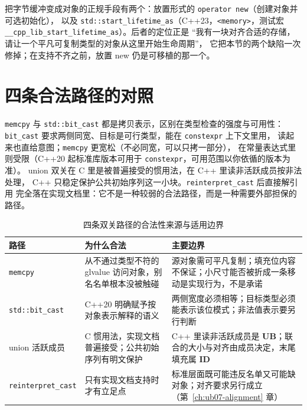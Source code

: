 \documentclass[12pt,a4paper,fontset=fandol]{ctexbook}
\newcommand{\cpp}[1]{C++#1}
\newcommand{\Tp}[1]{\texttt{#1}}
\newcommand{\Bk}{\discretionary{}{}{}}
\newcommand{\Lang}[1]{\textsf{#1}}
\newcommand{\CL}{\Lang{C}}
\newcommand{\CPP}{\Lang{C++}}
\newcommand{\UB}{\textbf{\textsf{UB}}}
\newcommand{\IDB}{\textbf{\textsf{ID}}}
\newcommand{\Hdr}[1]{\texttt{<#1>}}
\newcommand{\Feat}[1]{\texttt{#1}}
\begin{document}
把字节缓冲变成对象的正规手段有两个：放置形式的 \Tp{operator new}（创建对象并可选初始化），
以及 \Tp{std::start{\Bk}\_lifetime{\Bk}\_as}（\cpp{23}，\Hdr{memory}，测试宏
\Feat{\_\_cpp{\Bk}\_lib{\Bk}\_start{\Bk}\_lifetime{\Bk}\_as}）。后者的定位正是
“我有一块对齐合适的存储，请让一个平凡可复制类型的对象从这里开始生命周期”，
它把本节的两个缺陷一次修掉；在支持不齐之前，放置 new 仍是可移植的那一个。

\section{四条合法路径的对照}\label{sec:ub06-paths}

\begin{compare}[title={同一件事的四种写法，代价各不同}]
\Tp{memcpy} 与 \Tp{std::bit{\Bk}\_cast} 都是拷贝表示，区别在类型检查的强度与可用性：
\Tp{bit{\Bk}\_cast} 要求两侧同宽、目标是可行类型，能在 \Tp{constexpr} 上下文里用，
读起来也直给意图；\Tp{memcpy} 更宽松（不必同宽，可以只拷一部分），
在常量表达式里则受限（\cpp{20} 起标准库版本可用于 \Tp{constexpr}，可用范围以你依循的版本为准）。
union 双关在 \CL{} 里是被普遍接受的惯用法，在 \CPP{} 里读非活跃成员按非法处理，
\CPP{} 只稳定保护公共初始序列这一小块。\Tp{reinterpret{\Bk}\_cast} 后直接解引用
完全落在实现文档里：它不是一种较弱的合法路径，而是一种需要外部担保的路径。
\end{compare}

\begin{table}[H]
\centering
\caption{四条双关路径的合法性来源与适用边界}\label{tab:ub06-paths}
\begin{tabularx}{0.78\textwidth}{>{\raggedright\arraybackslash}p{} X >{\raggedright\arraybackslash}p{}}
\toprule
路径 & 为什么合法 & 主要边界 \\
\midrule
\Tp{memcpy} & 从不通过类型不符的 glvalue 访问对象，别名名单根本没被触碰 & 源对象需可平凡复制；填充位内容不保证；小尺寸能否被折成一条移动是实现行为，不是承诺 \\
\Tp{std::bit{\Bk}\_cast} & \cpp{20} 明确赋予按对象表示解释的语义 & 两侧宽度必须相等；目标类型必须能表示该位模式；非法值表示要另行判断 \\
union 活跃成员 & \CL{} 惯用法，实现文档普遍接受；公共初始序列有明文保护 & \CPP{} 里读非活跃成员是 \UB{}；联合的大小与对齐由成员决定，末尾填充属 \IDB{} \\
\Tp{reinterpret{\Bk}\_cast} & 只有实现文档支持时才有立足点 & 标准层面既可能违反名单又可能缺对象；对齐要求另行成立（第~\ref{ch:ub07-alignment} 章） \\
\bottomrule
\end{tabularx}
\end{table}
\end{document}
